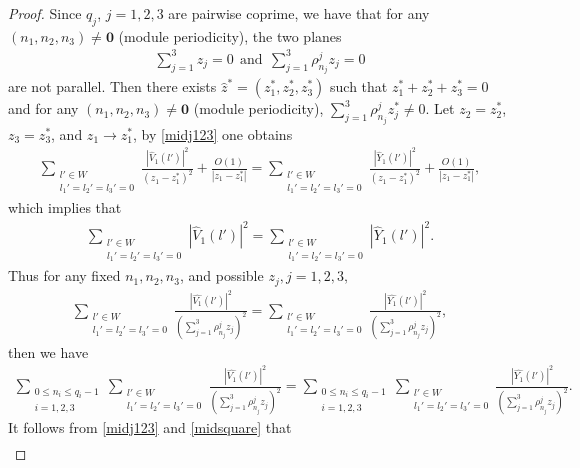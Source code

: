 \documentclass[12pt,letterpaper]{amsart}
\newcommand{\abs}[1]{\left\lvert #1 \right\rvert}
\begin{document}
\begin{proof}
Since $q_j$, $j=1,2,3$ are pairwise coprime, we have that for any $(n_1,n_2,n_3)\neq \mathbf{0}$ (module periodicity), the two planes
\begin{align}
\sum_{j=1}^{{3}}z_j=0 \ \ \mathrm{and}\ \  \sum_{j=1}^{{3}}\rho^j_{n_j}z_j=0\nonumber
\end{align}
are not parallel. Then there exists  $\hat{z}^*=(z_1^*,z_2^*,z_{3}^*)$ such that $z_1^*+z_2^*+z_3^*=0$
and for any $(n_1,n_2,n_3)\neq \mathbf{0}$ (module periodicity),
$
\sum_{j=1}^{{3}}\rho^j_{n_j}z_j^*\neq 0.
$
Let $z_2=z_2^*$, $z_3=z_3^*$, and $z_1\to z_1^*$, by \eqref{midj123} one obtains
\begin{align}
\sum_{\substack{l'\in W\\ l_1'=l_2'=l_3'=0}}\frac{\abs{\hat{V}_1(l')}^2}{(z_1-z_1^*)^2}+\frac{O(1)}{\abs{z_1-z_1^*}}=\sum_{\substack{l'\in W\\ l_1'=l_2'=l_3'=0}}\frac{\abs{\hat{Y}_1(l')}^2}{(z_1-z_1^*)^2}+\frac{O(1)}{\abs{z_1-z_1^*}},\nonumber
\end{align}
which implies that
\begin{align}
\sum_{\substack{l'\in W\\ l_1'=l_2'=l_3'=0}}\abs{\hat{V}_1(l')}^2=\sum_{\substack{l'\in W\\ l_1'=l_2'=l_3'=0}}\abs{\hat{Y}_1(l')}^2.\nonumber
\end{align}
Thus for any fixed $n_1,n_2,n_3$, and possible $z_j,j=1,2,3,$
\begin{align}
\sum_{\substack{l'\in W\\l_1'=l_2'=l_3'=0}}\frac{\abs{\hat{V_1}(l')}^2}{\left(\sum_{j=1}^3\rho^j_{n_j}z_j\right)^2}=\sum_{\substack{l'\in W\\l_1'=l_2'=l_3'=0}}\frac{\abs{\hat{Y_1}(l')}^2}{\left(\sum_{j=1}^3\rho^j_{n_j}z_j\right)^2},\nonumber
\end{align}
then we have
\begin{align}
\sum_{\substack{0\leq n_i\leq q_i-1\\i=1,2,3}}\sum_{\substack{l'\in W\\l_1'=l_2'=l_3'=0}}\frac{\abs{\hat{V_1}(l')}^2}{\left(\sum_{j=1}^3\rho^j_{n_j}z_j\right)^2}=\sum_{\substack{0\leq n_i\leq q_i-1\\i=1,2,3}}\sum_{\substack{l'\in W\\l_1'=l_2'=l_3'=0}}\frac{\abs{\hat{Y_1}(l')}^2}{\left(\sum_{j=1}^3\rho^j_{n_j}z_j\right)^2}.\label{midsquare}
\end{align}
It follows from \eqref{midj123} and \eqref{midsquare} that
\begin{align}

\end{align}
\end{proof}
\end{document}
